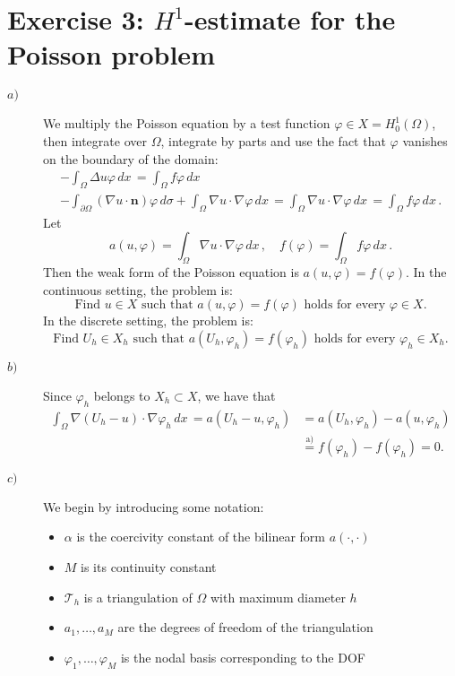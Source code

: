 \documentclass[a4paper]{article}
\renewcommand{\vec}[1]{\mathbf{#1}}
\newcommand{\dx}{\, dx \,}
\newcommand{\dsigma}{\, d\sigma}
\begin{document}
\section*{Exercise 3: $H^1$-estimate for the Poisson problem}
\begin{description}
\item[$a)$] We multiply the Poisson equation by a test function
	$\varphi \in X = H^1_0(\Omega)$, then integrate over $\Omega$,
	integrate by parts and use the fact that $\varphi$
	vanishes on the boundary of the domain:
	\begin{gather*}
	- \int_\Omega \Delta u \varphi \dx
	= \int_\Omega f \varphi \dx \\
	- \int_{\partial\Omega} (\nabla u \cdot \vec{n})\varphi \dsigma
	+ \int_\Omega \nabla u \cdot \nabla \varphi \dx
	= \int_\Omega \nabla u \cdot \nabla \varphi \dx
	= \int_\Omega f \varphi \dx.
	\end{gather*}
	Let
	\[
	a(u,\varphi) = \int_\Omega \nabla u \cdot \nabla \varphi \dx,
	\quad f(\varphi) = \int_\Omega f \varphi \dx.
	\]
	Then the weak form of the Poisson equation is $a(u,\varphi) = f(\varphi)$.
	In the continuous setting, the problem is:
	\[
	\text{Find } u \in X \text{ such that }
	a(u,\varphi) = f(\varphi) \text{ holds for every } \varphi \in X.
	\]
	In the discrete setting, the problem is:
	\[
	\text{Find } U_h \in X_h \text{ such that }
	a(U_h,\varphi_h) = f(\varphi_h) \text{ holds for every } \varphi_h \in X_h.
	\]
\item[$b)$] Since $\varphi_h$ belongs to $X_h \subset X$, we have that
\begin{align*}
	\int_\Omega \nabla(U_h-u) \cdot \nabla\varphi_h \dx
	= a(U_h-u,\varphi_h)
&	= a(U_h,\varphi_h) - a(u,\varphi_h) \\
&	\stackrel{\text{a)}}{=} f(\varphi_h) - f(\varphi_h)
	= 0.
\end{align*}
\item[$c)$] We begin by introducing some notation:
	\begin{itemize}
	\item $\alpha$ is the coercivity constant of the bilinear form $a(\cdot,\cdot)$
	\item $M$ is its continuity constant
	\item $\mathcal{T}_h$ is a triangulation of $\Omega$ with maximum diameter $h$
	\item $a_1,\dots,a_M$ are the degrees of freedom of the triangulation
	\item $\varphi_1,\dots,\varphi_M$ is the nodal basis corresponding to the DOF

\end{itemize}
\end{description}
\end{document}
